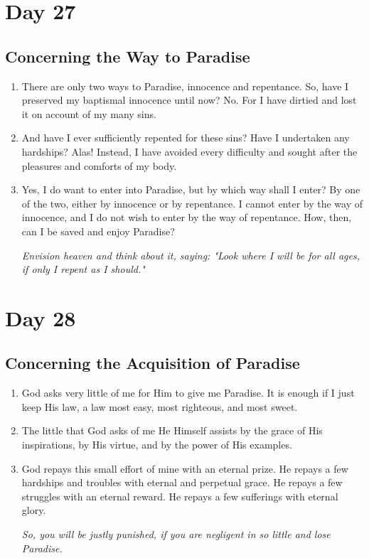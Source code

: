 \documentclass[11pt]{article}
\begin{document}
\section*{Day 27}
\label{sec:org7e61c54}
\subsection*{Concerning the Way to Paradise}
\label{sec:orgf8f71ee}
\begin{enumerate}
\item There are only two ways to Paradise, innocence and repentance. So, have I preserved my baptismal innocence until now? No. For I have dirtied and lost it on account of my many sins.
\item And have I ever sufficiently repented for these sins? Have I undertaken any hardships? Alas! Instead, I have avoided every difficulty and sought after the pleasures and comforts of my body.
\item Yes, I do want to enter into Paradise, but by which way shall I enter? By one of the two, either by innocence or by repentance. I cannot enter by the way of innocence, and I do not wish to enter by the
way of repentance. How, then, can I be saved and enjoy Paradise?

\emph{Envision heaven and think about it, saying: "Look where I will be for all ages, if only I repent as I should."}
\end{enumerate}
\section*{Day 28}
\label{sec:org54c9088}
\subsection*{Concerning the Acquisition of Paradise}
\label{sec:org0ab691d}
\begin{enumerate}
\item God asks very little of me for Him to give me Paradise. It is enough if I just keep His law, a law most easy, most righteous, and most sweet.
\item The little that God asks of me He Himself assists by the grace of His inspirations, by His virtue, and by the power of His examples.
\item God repays this small effort of mine with an eternal prize. He repays a few hardships and troubles with eternal and perpetual grace.
He repays a few struggles with an eternal reward. He repays a few sufferings with eternal glory.

\emph{So, you will be justly punished, if you are negligent in so little and lose Paradise.}
\end{enumerate}
\end{document}
